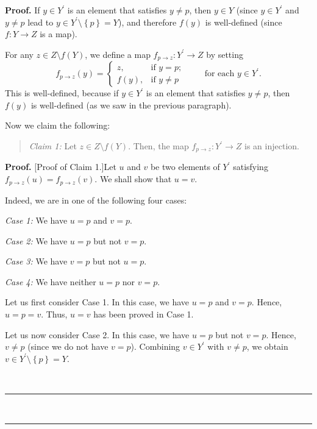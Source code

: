 \documentclass[numbers=enddot,12pt,final,onecolumn,notitlepage]{scrartcl}%
\numberwithin{exer}{section}
\theoremstyle{definition}
\newenvironment{statement}{\begin{quote}}{\end{quote}}
\newenvironment{proof}[1][Proof]{\noindent\textbf{#1.} }{\ \rule{0.5em}{0.5em}}
\newenvironment{verlong}{}{}
\begin{document}
\begin{verlong}
\begin{proof}
If $y\in Y^{\prime}$ is an element that satisfies $y\neq p$, then $y\in Y$
(since $y\in Y^{\prime}$ and $y\neq p$ lead to $y\in Y^{\prime}\setminus
\left\{  p\right\}  =Y$), and therefore $f\left(  y\right)  $ is well-defined
(since $f:Y\rightarrow Z$ is a map).

For any $z\in Z\setminus f\left(  Y\right)  $, we define a map
$f_{p\rightarrow z}:Y^{\prime}\rightarrow Z$ by setting%
\[
f_{p\rightarrow z}\left(  y\right)  =%
\begin{cases}
z, & \text{if }y=p;\\
f\left(  y\right)  , & \text{if }y\neq p
\end{cases}
\ \ \ \ \ \ \ \ \ \ \text{for each }y\in Y^{\prime}.
\]
This is well-defined, because if $y\in Y^{\prime}$ is an element that
satisfies $y\neq p$, then $f\left(  y\right)  $ is well-defined (as we saw in
the previous paragraph).

Now we claim the following:

\begin{statement}
\textit{Claim 1:} Let $z\in Z\setminus f\left(  Y\right)  $. Then, the map
$f_{p\rightarrow z}:Y^{\prime}\rightarrow Z$ is an injection.
\end{statement}

\begin{proof}
[Proof of Claim 1.]Let $u$ and $v$ be two elements of $Y^{\prime}$ satisfying
$f_{p\rightarrow z}\left(  u\right)  =f_{p\rightarrow z}\left(  v\right)  $.
We shall show that $u=v$.

Indeed, we are in one of the following four cases:

\textit{Case 1:} We have $u=p$ and $v=p$.

\textit{Case 2:} We have $u=p$ but not $v=p$.

\textit{Case 3:} We have $v=p$ but not $u=p$.

\textit{Case 4:} We have neither $u=p$ nor $v=p$.

Let us first consider Case 1. In this case, we have $u=p$ and $v=p$. Hence,
$u=p=v$. Thus, $u=v$ has been proved in Case 1.

Let us now consider Case 2. In this case, we have $u=p$ but not $v=p$. Hence,
$v\neq p$ (since we do not have $v=p$). Combining $v\in Y^{\prime}$ with
$v\neq p$, we obtain $v\in Y^{\prime}\setminus\left\{  p\right\}  =Y$.


\end{proof}
\end{proof}
\end{verlong}
\end{document}

